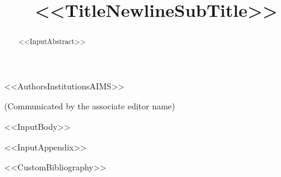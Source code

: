 \documentclass[%
<<DocumentClassOptions>>]{aims}
\title[<<ShortTitle>>]{<<TitleNewlineSubTitle>>}
\author[<<AuthorsRunningHeadAIMS>>]{}
\begin{document}
\maketitle

<<AuthorsInstitutionsAIMS>>

\bigskip

\centerline{(Communicated by the associate editor name)}

\begin{abstract}
<<InputAbstract>>
\end{abstract}

<<InputBody>>

\appendix
<<InputAppendix>>


<<CustomBibliography>>
\end{document}
